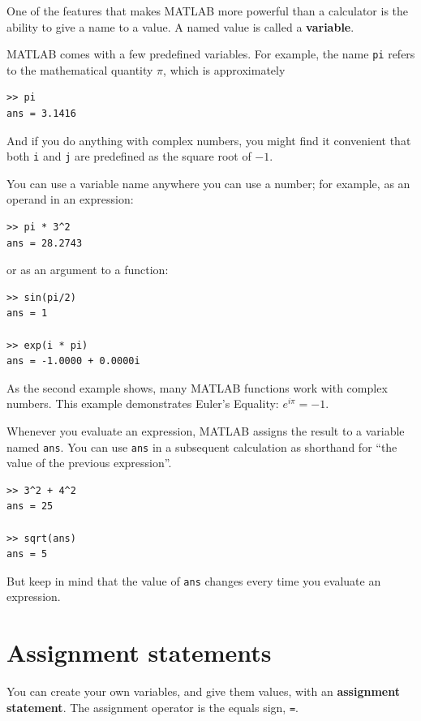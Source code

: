 \documentclass{book}
\begin{document}
One of the features that makes MATLAB more powerful than a calculator
is the ability to give a name to a value.  A named value is called
a {\bf variable}.

MATLAB comes with a few predefined variables.  For
example, the name {\tt pi} refers to the
mathematical quantity $\pi$, which is approximately

\begin{verbatim}
>> pi
ans = 3.1416
\end{verbatim}

And if you do anything with complex numbers, you might find it
convenient that both {\tt i} and {\tt j} are predefined as the square
root of $-1$.

You can use a variable name anywhere you can use a number; for example, as
an operand in an expression:

\begin{verbatim}
>> pi * 3^2
ans = 28.2743
\end{verbatim}

or as an argument to a function:

\begin{verbatim}
>> sin(pi/2)
ans = 1

>> exp(i * pi)
ans = -1.0000 + 0.0000i
\end{verbatim}

As the second example shows, many MATLAB functions work with
complex numbers.  This example demonstrates Euler's Equality:
$e^{i \pi} = -1$.

Whenever you evaluate an expression, MATLAB assigns the result to
a variable named {\tt ans}.  You can use {\tt ans} in a subsequent
calculation as shorthand for ``the value of the previous expression''.

\begin{verbatim}
>> 3^2 + 4^2
ans = 25

>> sqrt(ans)
ans = 5
\end{verbatim}

But keep in mind that the value of {\tt ans} changes every time
you evaluate an expression.


\section{Assignment statements}

You can create your own variables, and give them values, with
an {\bf assignment statement}.  The assignment operator is the
equals sign, {\tt =}.
\end{document}
